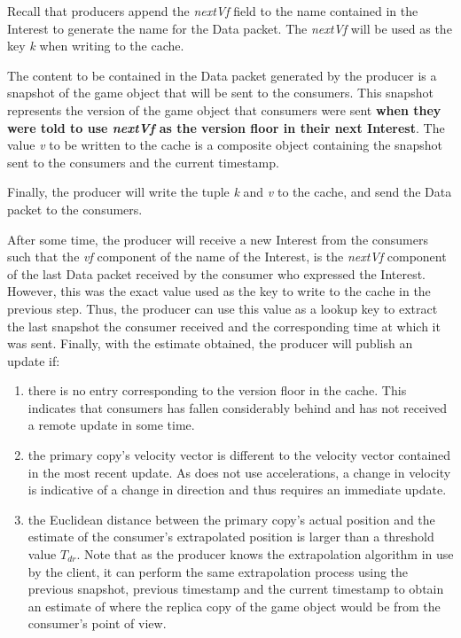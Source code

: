 Recall that producers append the \textit{nextVf} field to the name contained in the Interest to generate the name for the Data packet. The \textit{nextVf} will be used as the key \textit{k} when writing to the cache.

The content to be contained in the Data packet generated by the producer is a snapshot of the game object that will be sent to the consumers. This snapshot represents the version of the game object that consumers were sent \textbf{when they were told to use \textit{nextVf} as the version floor in their next Interest}. The value \textit{v} to be written to the cache is a composite object containing the snapshot sent to the consumers and the current timestamp. 

Finally, the producer will write the tuple \textit{k} and \textit{v} to the cache, and send the Data packet to the consumers. 

After some time, the producer will receive a new Interest from the consumers such that the \textit{vf} component of the name of the Interest, is the \textit{nextVf} component of the last Data packet received by the consumer who expressed the Interest. However, this was the exact value used as the key to write to the cache in the previous step. Thus, the producer can use this value as a lookup key to extract the last snapshot the consumer received and the corresponding time at which it was sent. Finally, with the estimate obtained, the producer will publish an update if:


\begin{enumerate}
    \item there is no entry corresponding to the version floor in the cache. This indicates that consumers has fallen considerably behind and has not received a remote update in some time. 
    \item the primary copy's velocity vector is different to the velocity vector contained in the most recent update. As \game{} does not use accelerations, a change in velocity is indicative of a change in direction and thus requires an immediate update.
    \item the Euclidean distance between the primary copy's actual position and the estimate of the consumer's extrapolated position is larger than a threshold value $T_{dr}$. Note that as the producer knows the extrapolation algorithm in use by the client, it can perform the same extrapolation process using the previous snapshot, previous timestamp and the current timestamp to obtain an estimate of where the replica copy of the game object would be from the consumer's point of view. 
\end{enumerate}

